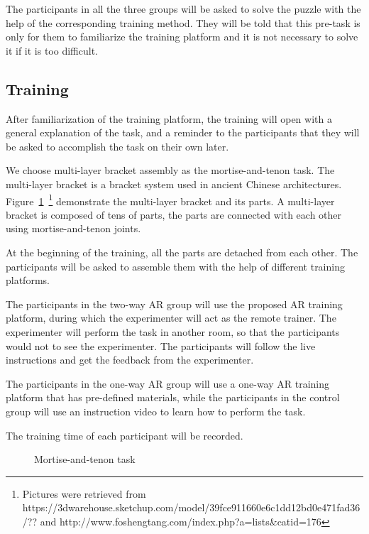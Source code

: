 The participants in all the three groups will be asked to solve the puzzle with the help of the corresponding training method. They will be told that this pre-task is only for them to familiarize the training platform and it is not necessary to solve it if it is too difficult.

\subsection{Training}

After familiarization of the training platform, the training will open with a general explanation of the task, and a reminder to the participants that they will be asked to accomplish the task on their own later.

We choose multi-layer bracket assembly as the mortise-and-tenon task.
The multi-layer bracket is a bracket system used in ancient Chinese architectures.
Figure~\ref{fig:mat-task}~\footnote{Pictures were retrieved from https://3dwarehouse.sketchup.com/model/39fce911660e6c1dd12bd0e471fad36/?? and http://www.foshengtang.com/index.php?a=lists\&catid=176} demonstrate the multi-layer bracket and its parts. A multi-layer bracket is composed of tens of parts, the parts are connected with each other using mortise-and-tenon joints.

At the beginning of the training, all the parts are detached from each other. The participants will be asked to assemble them with the help of different training platforms.

The participants in the two-way AR group will use the proposed AR training platform, during which the experimenter will act as the remote trainer. The experimenter will perform the task in another room, so that the participants would not to see the experimenter. The participants will follow the live instructions and get the feedback from the experimenter.

The participants in the one-way AR group will use a one-way AR training platform that has pre-defined materials, while the participants in the control group will use an instruction video to learn how to perform the task.

The training time of each participant will be recorded.

\begin{figure}
	\centering
	\caption{Mortise-and-tenon task}
	\label{fig:mat-task}
\end{figure}


